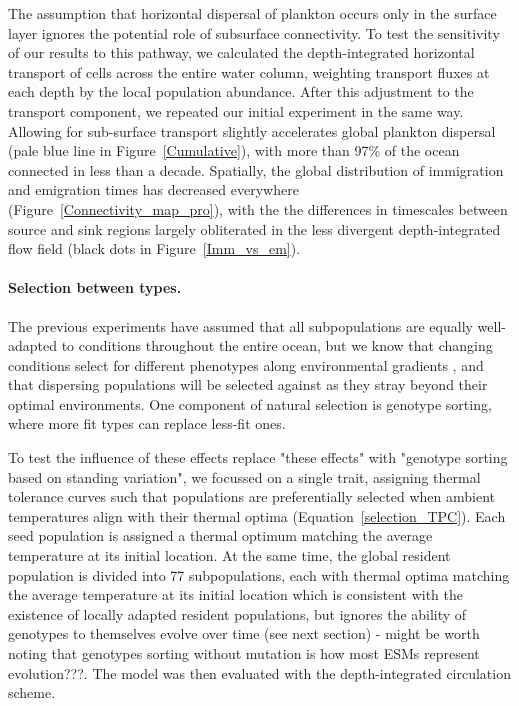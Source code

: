 \documentclass[12pt]{article}
\newcommand{\sinead}[1]{{\color{green} #1}}
\begin{document}
The assumption that horizontal dispersal of plankton occurs only in the surface layer ignores the potential role of subsurface connectivity. To test the sensitivity of our results to this pathway, we calculated the depth-integrated horizontal transport of cells across the entire water column, weighting transport fluxes at each depth by the local population abundance. After this adjustment to the transport component, we repeated our initial experiment in the same way. 
Allowing for sub-surface transport slightly accelerates global plankton dispersal (pale blue line in Figure~\ref{Cumulative}), with more than 97\% of the ocean connected in less than a decade. Spatially, the global distribution of immigration and emigration times has decreased everywhere (Figure~\ref{Connectivity_map_pro}), with the the differences in timescales between source and sink regions largely obliterated in the less divergent depth-integrated flow field (black dots in Figure~\ref{Imm_vs_em}). 

\paragraph{Selection between types.}

The previous experiments have assumed that all subpopulations are equally well-adapted to conditions throughout the entire ocean, but we know that changing conditions select for different phenotypes along environmental gradients \citep{Tilman:1990,Thomas:2012}, and that dispersing populations will be selected against as they stray beyond their optimal environments. \sinead{One component of natural selection is genotype sorting, where more fit types can replace less-fit ones.}

To test the influence of these effects \sinead{replace "these effects" with "genotype sorting based on standing variation"}, we focussed on a single trait, assigning thermal tolerance curves such that populations are preferentially selected when ambient temperatures align with their thermal optima (Equation~\ref{selection_TPC}). Each seed population is assigned a thermal optimum matching the average temperature at its initial location. At the same time, the global resident population is divided into 77 subpopulations, each with thermal optima matching the average temperature at its initial location \sinead{which is consistent with the existence of locally adapted resident populations, but ignores the ability of genotypes to themselves evolve over time (see next section) - might be worth noting that genotypes sorting without mutation is how most ESMs represent evolution???}. The model was then evaluated with the depth-integrated circulation scheme.
\end{document}
